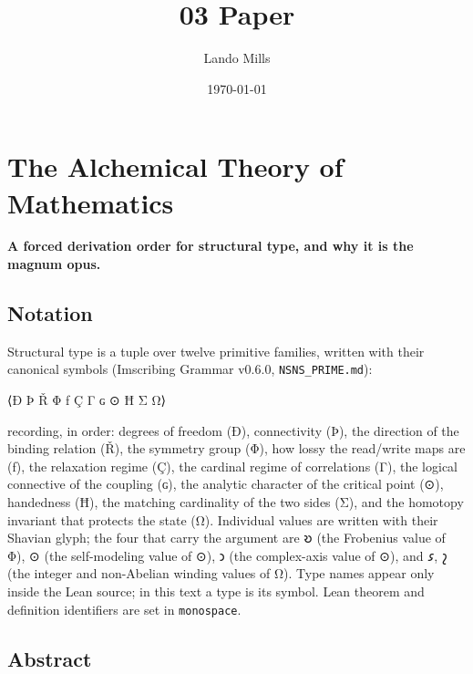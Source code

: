\documentclass[12pt,a4paper]{article}
\title{03 Paper}
\date{\today}
\author{Lando Mills}
\begin{document}
\maketitle
\hypertarget{the-alchemical-theory-of-mathematics}{%
\section{The Alchemical Theory of
Mathematics}\label{the-alchemical-theory-of-mathematics}}

\textbf{A forced derivation order for structural type, and why it is the
magnum opus.}

\hypertarget{notation}{%
\subsection{Notation}\label{notation}}

Structural type is a tuple over twelve primitive families, written with
their canonical symbols (Imscribing Grammar v0.6.0,
\texttt{NSNS\_PRIME.md}):

⟨Ð Þ Ř Φ ƒ Ç Γ ɢ ⊙ Ħ Σ Ω⟩

recording, in order: degrees of freedom (Ð), connectivity (Þ), the
direction of the binding relation (Ř), the symmetry group (Φ), how lossy
the read/write maps are (ƒ), the relaxation regime (Ç), the cardinal
regime of correlations (Γ), the logical connective of the coupling (ɢ),
the analytic character of the critical point (⊙), handedness (Ħ), the
matching cardinality of the two sides (Σ), and the homotopy invariant
that protects the state (Ω). Individual values are written with their
Shavian glyph; the four that carry the argument are 𐑹 (the Frobenius
value of Φ), ⊙ (the self-modeling value of ⊙), 𐑮 (the complex-axis value
of ⊙), and 𐑭, 𐑟 (the integer and non-Abelian winding values of Ω). Type
names appear only inside the Lean source; in this text a type is its
symbol. Lean theorem and definition identifiers are set in
\texttt{monospace}.

\hypertarget{abstract}{%
\subsection{Abstract}\label{abstract}}
\end{document}
